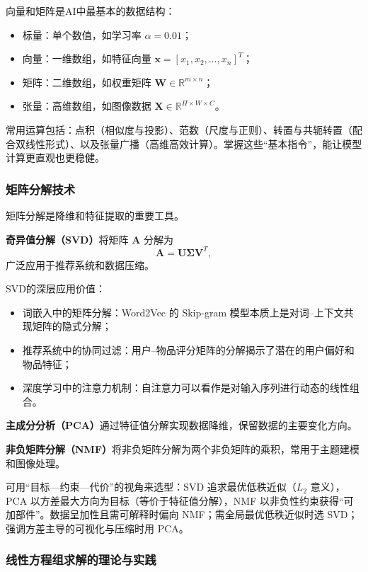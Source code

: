 向量和矩阵是AI中最基本的数据结构：
\begin{itemize}
  \item 标量：单个数值，如学习率 $\alpha = 0.01$；
  \item 向量：一维数组，如特征向量 $\mathbf{x} = [x_1, x_2, \ldots, x_n]^T$；
  \item 矩阵：二维数组，如权重矩阵 $\mathbf{W} \in \mathbb{R}^{m \times n}$；
  \item 张量：高维数组，如图像数据 $\mathbf{X} \in \mathbb{R}^{H \times W \times C}$。
\end{itemize}

常用运算包括：点积（相似度与投影）、范数（尺度与正则）、转置与共轭转置（配合双线性形式）、以及张量广播（高维高效计算）。掌握这些“基本指令”，能让模型计算更直观也更稳健。

\subsubsection{矩阵分解技术}

矩阵分解是降维和特征提取的重要工具。

\textbf{奇异值分解（SVD）}将矩阵 $\mathbf{A}$ 分解为
$$
\mathbf{A} = \mathbf{U}\mathbf{\Sigma}\mathbf{V}^T,
$$
广泛应用于推荐系统和数据压缩。

SVD的深层应用价值：
\begin{itemize}
  \item 词嵌入中的矩阵分解：Word2Vec 的 Skip-gram 模型本质上是对词–上下文共现矩阵的隐式分解；
  \item 推荐系统中的协同过滤：用户–物品评分矩阵的分解揭示了潜在的用户偏好和物品特征；
  \item 深度学习中的注意力机制：自注意力可以看作是对输入序列进行动态的线性组合。
\end{itemize}

\textbf{主成分分析（PCA）}通过特征值分解实现数据降维，保留数据的主要变化方向。

\textbf{非负矩阵分解（NMF）}将非负矩阵分解为两个非负矩阵的乘积，常用于主题建模和图像处理。

可用“目标—约束—代价”的视角来选型：SVD 追求最优低秩近似（$L_2$ 意义），PCA 以方差最大方向为目标（等价于特征值分解），NMF 以非负性约束获得“可加部件”。数据呈加性且需可解释时偏向 NMF；需全局最优低秩近似时选 SVD；强调方差主导的可视化与压缩时用 PCA。

\subsubsection{线性方程组求解的理论与实践}

